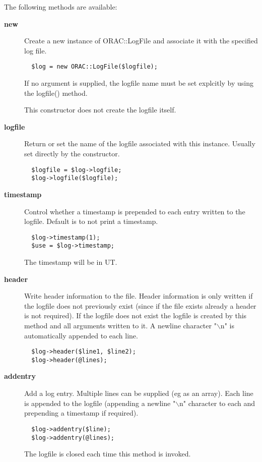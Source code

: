 The following methods are available:

\begin{description}
\item[\textbf{new}] \mbox{}

Create a new instance of ORAC::LogFile and associate it with the 
specified log file.

\begin{verbatim}
  $log = new ORAC::LogFile($logfile);
\end{verbatim}


If no argument is supplied, the logfile name must be set explcitly
by using the logfile() method.



This constructor does not create the logfile itself.

\item[\textbf{logfile}] \mbox{}

Return or set the name of the logfile associated with
this instance. Usually set directly by the constructor.

\begin{verbatim}
  $logfile = $log->logfile;
  $log->logfile($logfile);
\end{verbatim}
\item[\textbf{timestamp}] \mbox{}

Control whether a timestamp is prepended to each entry
written to the logfile. Default is to not print a timestamp.

\begin{verbatim}
  $log->timestamp(1);
  $use = $log->timestamp;
\end{verbatim}


The timestamp will be in UT.

\item[\textbf{header}] \mbox{}

Write header information to the file. Header information is only
written if the logfile does not previously exist (since if the file
exists already a header is not required). If the logfile does not
exist the logfile is created by this method and all arguments written
to it.  A newline character "$\backslash$n" is automatically appended to each
line.

\begin{verbatim}
  $log->header($line1, $line2);
  $log->header(@lines);
\end{verbatim}
\item[\textbf{addentry}] \mbox{}

Add a log entry. Multiple lines can be supplied (eg as an array).
Each line is appended to the logfile (appending a newline "$\backslash$n"
character to each and prepending a timestamp if required).

\begin{verbatim}
  $log->addentry($line);
  $log->addentry(@lines);
\end{verbatim}


The logfile is closed each time this method is invoked.

\end{description}
